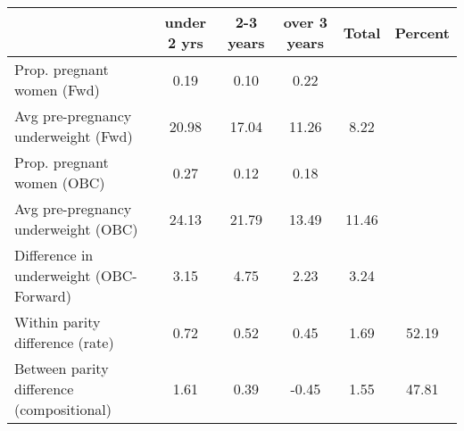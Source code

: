 \begin{tabular}{l*{5}{c}}
\toprule
            &\multicolumn{1}{c}{under 2 yrs}&\multicolumn{1}{c}{2-3 years}&\multicolumn{1}{c}{over 3 years}&\multicolumn{1}{c}{Total}&\multicolumn{1}{c}{Percent}\\
\midrule
\midrule
Prop. pregnant women (Fwd)&        0.19&        0.10&        0.22&            &            \\
Avg pre-pregnancy underweight (Fwd)&       20.98&       17.04&       11.26&        8.22&            \\
Prop. pregnant women (OBC)&        0.27&        0.12&        0.18&            &            \\
Avg pre-pregnancy underweight (OBC)&       24.13&       21.79&       13.49&       11.46&            \\
Difference in underweight (OBC-Forward)&        3.15&        4.75&        2.23&        3.24&            \\
Within parity difference (rate)&        0.72&        0.52&        0.45&        1.69&       52.19\\
Between parity difference (compositional)&        1.61&        0.39&       -0.45&        1.55&       47.81\\
\bottomrule
\end{tabular}
